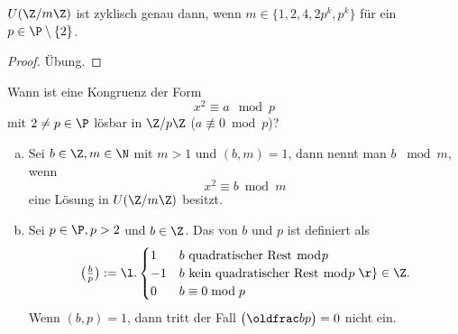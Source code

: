 \begin{kor} \label{2.12}
	$U(\Z / m\Z)$ ist zyklisch genau dann, wenn $m \in \{1, 2, 4, 2p^k, p^k \}$ für ein $p \in \P \setminus \{2\}$.
	\begin{proof}
		Übung.
		\Exercise
	\end{proof}
\end{kor}

Wann ist eine Kongruenz der Form
\[
	x^2 \equiv a \mod p
\]
mit $2 \neq p \in \P$ lösbar in $\Z / p\Z$ ($a \not\equiv 0 \bmod p$)?

\begin{df} \label{2.13}
	\begin{enumerate}[a)]
		\item
		Sei $b \in \Z, m \in \N$ mit $m > 1$ und $(b, m) = 1$, dann nennt man $b$  $\bmod m$, wenn
		\[
			x^2 \equiv b \bmod m
		\]
		eine Lösung in $U(\Z / m\Z)$ besitzt.
		\item
			Sei $p \in \P, p > 2$ und $b \in \Z$.
			Das  von $b$ und $p$ ist definiert als
			\[
				\legsym bp := \l.\begin{cases}
					1 & \text{$b$ quadratischer Rest $\bmod p$} \\
					-1 & \text{$b$ kein quadratischer Rest $\bmod p$} \\
					0 & \text{$b \equiv 0 \bmod p$}
				\end{cases}\r\}
				\in \Z.
			\]
			Wenn $(b, p) = 1$, dann tritt der Fall $\legsym bp = 0$ nicht ein.
	\end{enumerate}
\end{df}


